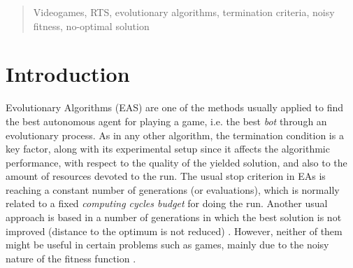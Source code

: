 \documentclass[runningheads,a4paper]{llncs}
\newcommand{\keywords}[1]{\par\addvspace\baselineskip
\noindent\keywordname\enspace\ignorespaces#1}
\begin{document}
\begin{abstract}
\keywords{Videogames, RTS, evolutionary algorithms, termination criteria, noisy fitness, no-optimal solution}
\end{abstract}

%
%
\section{Introduction}


Evolutionary Algorithms (EAS) are one of the methods usually applied
to find the best autonomous agent for playing a game, i.e. the best \textit{bot}
\cite{Agent_Smith_CEC2009,bots:evostar,unreal:gecco10:anon,DBLP:conf/cig/Fernandez-AresGMG12:anon}
through an evolutionary process.
As in any other algorithm, the termination condition is a key factor, along with its experimental setup since it affects the algorithmic performance, with respect to the quality of the yielded solution, and also to the amount of resources devoted to the run. 
The usual stop criterion in EAs \cite{EAs_Back96} is reaching a constant number of generations (or evaluations), 
 which is normally related to a fixed {\em computing cycles budget}
for doing the run. Another usual approach is based in a number of generations in
which the best solution is not improved (distance to the optimum is not reduced) \cite{RocheTermination13}. However, neither of them might be useful in certain problems such as games, mainly due to the noisy nature of the fitness function \cite{merelo14:noisy,bots:evostar}. 
\end{document}

